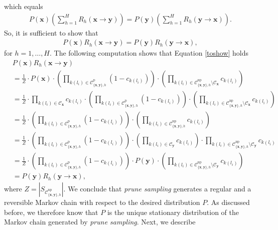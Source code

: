\documentclass[a4paper, twoside, 11pt]{report}
\newcommand{\bfx}{{\mathbf{x}}}
\newcommand{\C}{{\mathcal C}}
\theoremstyle{plain}
\theoremstyle{definition}
\theoremstyle{remark}
\newcommand{\ps}{\textit{prune sampling }}
\newcommand{\bfy}{{\mathbf{y}}}
\begin{document}
which equals
\begin{align*}
P(\mathbf{x}) \left(\sum_{h=1}^{H} {R}_h (\mathbf{x} \to \mathbf{y}) \right) = P(\mathbf{y}) \left(\sum_{h=1}^{H} {R}_h (\mathbf{y} \to \mathbf{x}) \right).
\end{align*}
So, it is sufficient to show that
\begin{align} \label{toshow}
P(\mathbf{x}) {R}_h (\mathbf{x} \to \mathbf{y}) = P(\mathbf{y})  {R}_h (\mathbf{y} \to \mathbf{x}), 
\end{align}
for $h = 1, \ldots, H$. The following computation shows that Equation \eqref{toshow} holds
\begin{align*}
&P(\mathbf{x}) {R}_h (\mathbf{x} \to \mathbf{y}) \\
&= \frac{1}{Z} \cdot P(\mathbf{x}) \cdot \left(\prod_{k(l_i) \in \C_{\{\bfx, \bfy\},h}^{\text{p}} } (1-c_{k(l_i)}) \right)\cdot \left( \prod_{k(l_i) \in \C_{\{\bfx, \bfy\},h}^{\text{np}}  \setminus \mathcal{C}_{\mathbf{x}} } c_{k(l_i)} \right) \\ 
&= \frac{1}{Z} \cdot \prod_{k(l_i) \in \mathcal{C}_{\mathbf{x}}} c_{k(l_i)} \cdot \left(\prod_{k(l_i) \in \C_{\{\bfx, \bfy\},h}^{\text{p}} } (1-c_{k(l_i)}) \right)\cdot \left( \prod_{k(l_i) \in \C_{\{\bfx, \bfy\},h}^{\text{np}} \setminus \mathcal{C}_{\mathbf{x}} } c_{k(l_i)} \right) \\ 
&= \frac{1}{Z} \cdot \left(\prod_{k(l_i) \in \C_{\{\bfx, \bfy\},h}^{\text{p}}} (1-c_{k(l_i)}) \right)\cdot \left( \prod_{k(l_i) \in \C_{\{\bfx, \bfy\},h}^{\text{np}}   } c_{k(l_i)}   \right) \\ 
&= \frac{1}{Z} \cdot \left(\prod_{k(l_i) \in \C_{\{\bfx, \bfy\},h}^{\text{p}}} (1-c_{k(l_i)}) \right)\cdot \left( \prod_{k(l_i) \in \mathcal{C}_{\mathbf{y}}} c_{k(l_i)}   \right) \cdot  \prod_{k(l_i) \in \C_{\{\bfx, \bfy\},h}^{\text{np}} \setminus \mathcal{C}_{\mathbf{y}}  } c_{k(l_i)} \\ 
&= \frac{1}{Z} \cdot \left(\prod_{k(l_i) \in \C_{\{\bfx, \bfy\},h}^{\text{p}} } (1-c_{k(l_i)}) \right)\cdot P(\mathbf{y}) \cdot\left( \prod_{k(l_i) \in \C_{\{\bfx, \bfy\},h}^{\text{np}}  \setminus \mathcal{C}_{\mathbf{y}}  } c_{k(l_i)}   \right) \\ 
&= P(\mathbf{y}) {R}_h (\mathbf{y} \to \mathbf{x}),
\end{align*}
\noindent where $Z = |S_{\C_{\{\bfx, \bfy\},h}^{\text{np}} }|$. We conclude that \ps generates a regular and a reversible Markov chain with respect to the desired distribution $P$. As discussed before, we therefore know that $P$ is the unique stationary distribution of the Markov chain generated by \textit{prune sampling}. Next, we describe
\end{document}

